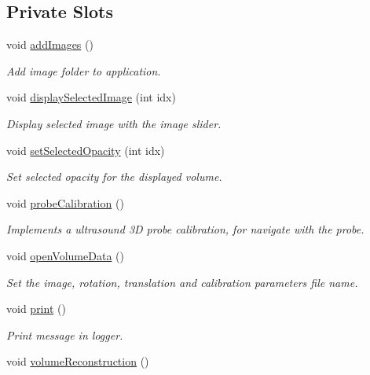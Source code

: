 \subsection*{Private Slots}
\begin{DoxyCompactItemize}
\item 
void \hyperlink{class_main_window_afdd9e98dfe3d68ab08aed2df37e8c1dc}{add\-Images} ()
\begin{DoxyCompactList}\small\item\em Add image folder to application. \end{DoxyCompactList}\item 
void \hyperlink{class_main_window_a67ec1c2d082b1b5a63347df9660275f1}{display\-Selected\-Image} (int idx)
\begin{DoxyCompactList}\small\item\em Display selected image with the image slider. \end{DoxyCompactList}\item 
void \hyperlink{class_main_window_a65b1fde248d1db6fab4ddb58315d3802}{set\-Selected\-Opacity} (int idx)
\begin{DoxyCompactList}\small\item\em Set selected opacity for the displayed volume. \end{DoxyCompactList}\item 
void \hyperlink{class_main_window_a7a01aa3ba0210c1915d53d37d7272a13}{probe\-Calibration} ()
\begin{DoxyCompactList}\small\item\em Implements a ultrasound 3\-D probe calibration, for navigate with the probe. \end{DoxyCompactList}\item 
void \hyperlink{class_main_window_a66293ccc95d836b4b014e6bdc5e2ae9f}{open\-Volume\-Data} ()
\begin{DoxyCompactList}\small\item\em Set the image, rotation, translation and calibration parameters file name. \end{DoxyCompactList}\item 
void \hyperlink{class_main_window_a873aaee370c1456b99f1a2399ff13691}{print} ()
\begin{DoxyCompactList}\small\item\em Print message in logger. \end{DoxyCompactList}\item 
void \hyperlink{class_main_window_a51a6d66666f907cee479298f561a87c6}{volume\-Reconstruction} ()

\end{DoxyCompactItemize}
